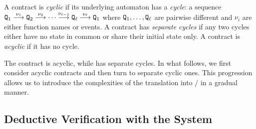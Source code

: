 \begin{definition}
  \label{def:determinate}
  A {\Stipula} contract is \emph{cyclic} if its underlying automaton
  has a \emph{cycle}: a sequence
  ${\tt Q}_1 \mathrel{\stackrel{\nu_1}{\longrightarrow}} {\tt Q}_{2} \mathrel{\stackrel{\nu_2}{\longrightarrow}} \cdots \mathrel{\stackrel{\nu_{\ell-1}}{\longrightarrow}}
  {\tt Q}_\ell \mathrel{\stackrel{\nu_\ell}{\longrightarrow}} {\tt Q}_{1}$ where ${\tt Q}_1,\ldots,{\tt Q}_\ell$ are
  pairwise different and $\nu_i$ are either function names or
  events. A contract has \emph{separate cycles} if any two cycles
  either have no state in common or share their initial state only.
  A contract is \emph{acyclic} if it has no cycle.
\end{definition}

The contract  is acyclic, while  has
separate cycles.  In what follows, we first consider acyclic contracts
and then turn to separate cyclic ones. This progression allows us to
introduce the complexities of the translation into {\JML}/{\Java} in a gradual
manner.

\subsection{Deductive Verification with the {\KeY} System}
\label{subsect:key}

